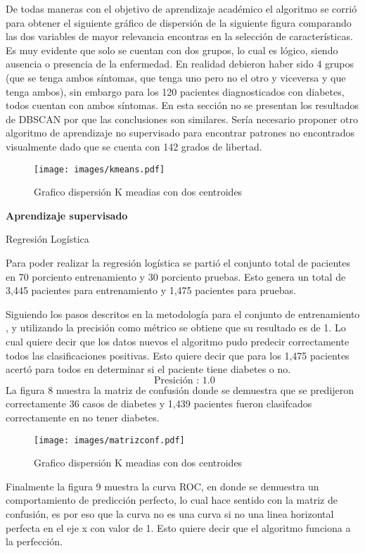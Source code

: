 \documentclass[twocolumn]{bmcart}%
\begin{document}
\begin{itemize}
De todas maneras con el objetivo de aprendizaje académico el algoritmo se corrió para obtener el siguiente gráfico de dispersión de la siguiente figura comparando las dos variables de mayor relevancia encontras en la selección de características. Es muy evidente que solo se cuentan con dos grupos, lo cual es lógico, siendo ausencia o presencia de la enfermedad. En realidad debieron haber sido 4 grupos (que se tenga ambos síntomas, que tenga uno pero no el otro y viceversa y que tenga ambos), sin embargo para los 120 pacientes diagnosticados con diabetes, todos cuentan con ambos síntomas. En esta sección no se presentan los resultados de DBSCAN por que las conclusiones son similares. Sería necesario proponer otro algoritmo de aprendizaje no supervisado para encontrar patrones no encontrados visualmente dado que se cuenta con 142 grados de libertad.


\begin{figure}[h!]
  \caption{\csentence{}
      Grafico dispersión K meadias con dos centroides}
\texttt{[image: images/kmeans.pdf]}  
      \end{figure}
        
\textbf{Aprendizaje supervisado}

Regresión Logística

Para poder realizar la regresión logística se partió el conjunto total de pacientes en 70 porciento entrenamiento y 30 porciento pruebas. Esto genera un total de 3,445 pacientes para entrenamiento y 1,475 pacientes para pruebas. 

Siguiendo los pasos descritos en la metodología para el conjunto de entrenamiento , y utilizando la precisión como métrico se obtiene que su resultado es de 1. Lo cual quiere decir que los datos nuevos el algoritmo pudo predecir correctamente todos las clasificaciones positivas. Esto quiere decir que para los 1,475 pacientes acertó para todos en determinar si el paciente tiene diabetes o no. 
$$
\text { Presición : } 1.0
$$
La figura 8 muestra la matriz de confusión donde se demuestra que se predijeron correctamente 36 casos de diabetes y 1,439 pacientes fueron clasifcados correctamente en no tener diabetes. 

\begin{figure}[h!]
  \caption{\csentence{}
      Grafico dispersión K meadias con dos centroides}
\texttt{[image: images/matrizconf.pdf]}  
      \end{figure}

Finalmente la figura 9 muestra la curva ROC, en donde se demuestra un comportamiento de predicción perfecto, lo cual hace sentido con la matriz de confusión, es por eso que la curva no es una curva si no una linea horizontal perfecta en el eje x con valor de 1. Esto quiere decir que el algoritmo funciona a la perfección. 


\end{itemize}
\end{document}

